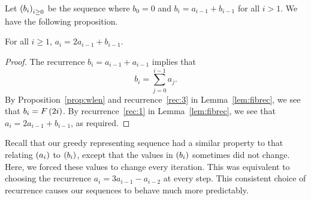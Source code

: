 \documentclass[english,12pt]{article}
\newcommand{\seq}{\p}
\begin{document}
Let $\seq{b_i}_{i\geq0}$ be the sequence where $b_0=0$ and $b_i=a_{i-1}+b_{i-1}$ for all $i>1$.  We have the following proposition.
\begin{prop}\label{prop:sumproperty}
For all $i\geq1$, $a_i=2a_{i-1}+b_{i-1}$.
\end{prop}
\begin{proof}
The recurrence $b_i=a_{i-1}+a_{i-1}$ implies that
\[
b_i=\sum_{j=0}^{i-1}a_j.
\]
By Proposition~\ref{prop:wlen} and recurrence~\ref{rec:3} in Lemma~\ref{lem:fibrec}, we see that $b_i=F\left(2i\right)$.  By recurrence~\ref{rec:1} in Lemma~\ref{lem:fibrec}, we see that $a_i=2a_{i-1}+b_{i-1}$, as required.
\end{proof}
Recall that our greedy representing sequence had a similar property to that relating $\seq{a_i}$ to $\seq{b_i}$, except that the values in $\seq{b_i}$ sometimes did not change.  Here, we forced these values to change every iteration.  This was equivalent to choosing the recurrence $a_i=3a_{i-1}-a_{i-2}$ at every step.  This consistent choice of recurrence causes our sequences to behave much more predictably.
\end{document}
